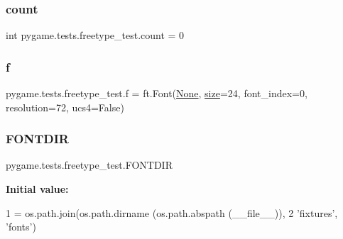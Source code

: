 \subsubsection{\texorpdfstring{count}{count}}
{\footnotesize\ttfamily int pygame.\+tests.\+freetype\+\_\+test.\+count = 0}

\mbox{\label{namespacepygame_1_1tests_1_1freetype__test_a41e4b2a027fb6abd91a559fed87bb3c1}} 
\subsubsection{\texorpdfstring{f}{f}}
{\footnotesize\ttfamily pygame.\+tests.\+freetype\+\_\+test.\+f = ft.\+Font(\hyperlink{namespacepygame_1_1tests_1_1freetype__test_a68ff732e0bcda8dbe10438d0b43cdcd2}{None}, \hyperlink{namespacepygame_1_1tests_1_1freetype__test_ad75d5e6258fdce7db138e01e9d36d7e3}{size}=24, font\+\_\+index=0, resolution=72, ucs4=False)}

\mbox{\label{namespacepygame_1_1tests_1_1freetype__test_ac9e375c319f5effa93b928fa60045d59}} 
\subsubsection{\texorpdfstring{F\+O\+N\+T\+D\+IR}{FONTDIR}}
{\footnotesize\ttfamily pygame.\+tests.\+freetype\+\_\+test.\+F\+O\+N\+T\+D\+IR}

{\bfseries Initial value\+:}
\begin{DoxyCode}
1 =  os.path.join(os.path.dirname (os.path.abspath (\_\_file\_\_)),
2                        \textcolor{stringliteral}{'fixtures'}, \textcolor{stringliteral}{'fonts'})
\end{DoxyCode}
\mbox{\label{namespacepygame_1_1tests_1_1freetype__test_a30673dfad73393663cb05f6351cf9ba9}} 

